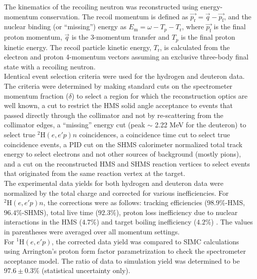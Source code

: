 \indent The kinematics of the recoiling neutron was reconstructed using energy-momentum conservation. The recoil momentum is defined as $\vec{p_{\mathrm{r}}} = \vec{q} - \vec{p_{\mathrm{f}}}$,
and the nuclear binding (or ``missing'') energy as $E_{\mathrm{m}} = \omega - T_{p} - T_{\mathrm{r}}$, where $\vec{p_{\mathrm{f}}}$ is the final proton momentum, $\vec{q}$ is the
3-momentum transfer and $T_{p}$ is the final proton kinetic energy. The recoil particle kinetic energy, $T_{\mathrm{r}}$, is calculated from the electron and proton
4-momentum vectors assuming an exclusive three-body final state with a recoiling neutron.\\
\indent Identical event selection criteria were used for the hydrogen and deuteron data. The criteria were determined by making standard cuts on the spectrometer momentum fraction ($\delta$) to select a region for which the reconstruction optics
are well known,  a cut to restrict the HMS solid angle acceptance to events that passed directly through the collimator and not by re-scattering from the collimator edges, a ``missing''
energy cut (peak $\sim$ 2.22 MeV for the deuteron) to select true $^{2}\mathrm{H}(e,e'p)n$ coincidences, a coincidence time cut to select true coincidence events, a PID cut on the
SHMS calorimeter normalized total track energy to select electrons and not other sources of background (mostly pions), and a cut on the reconstructed HMS and SHMS reaction vertices to select events that 
originated from the same reaction vertex at the target.\\
\indent The experimental data yields for both hydrogen and deuteron data were normalized by the total charge and corrected for various inefficiencies. For $^{2}\mathrm{H}(e,e'p)n$, the corrections
were as follows: tracking efficiencies ($98.9 \%$-HMS, $96.4 \%$-SHMS), total live time ($92.3 \%$), proton loss inefficiency due to nuclear interactions in the HMS ($4.7 \%$) \cite{cyero_phdthesis} and
target boiling inefficiency ($4.2 \%$) \cite{cyero_phdthesis}. The values in parentheses were averaged over all momentum settings. \\
\indent For $^{1}\mathrm{H}(e,e'p)$, the corrected data yield was compared to SIMC calculations using Arrington's proton form factor parametrization \cite{PhysRevC.69.022201} to check the spectrometer acceptance
model. The ratio of data to simulation yield was determined to be $97.6\pm0.3 \%$ (statistical uncertainty only).\\
